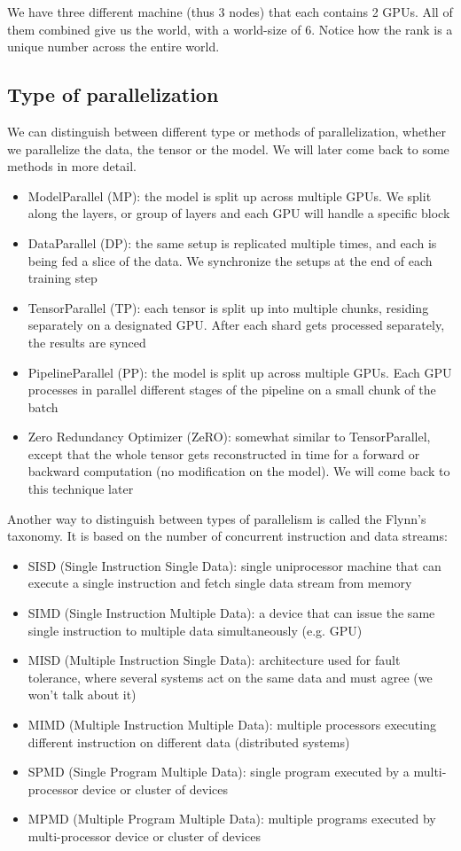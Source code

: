 \documentclass{article}
\begin{document}
We have three different machine (thus 3 nodes) that each contains 2 GPUs. All of them combined give us the world, with a world-size of 6. Notice how the rank is a unique number across the entire world.

\subsection{Type of parallelization}
We can distinguish between different type or methods of parallelization, whether we parallelize the data, the tensor or the model. We will later come back to some methods in more detail.
\begin{itemize}
  \item ModelParallel (MP): the model is split up across multiple GPUs. We split along the layers, or group of layers and each GPU will handle a specific block
  \item DataParallel (DP): the same setup is replicated multiple times, and each is being fed a slice of the data. We synchronize the setups at the end of each training step
  \item TensorParallel (TP): each tensor is split up into multiple chunks, residing separately on a designated GPU. After each shard gets processed separately, the results are synced
  \item PipelineParallel (PP): the model is split up across multiple GPUs. Each GPU processes in parallel different stages of the pipeline on a small chunk of the batch
  \item Zero Redundancy Optimizer (ZeRO): somewhat similar to TensorParallel, except that the whole tensor gets reconstructed in time for a forward or backward computation (no modification on the model). We will come back to this technique later
\end{itemize}

Another way to distinguish between types of parallelism is called the Flynn's taxonomy. It is based on the number of concurrent instruction and data streams:
\begin{itemize}
  \item SISD (Single Instruction Single Data): single uniprocessor machine that can execute a single instruction and fetch single data stream from memory
  \item SIMD (Single Instruction Multiple Data): a device that can issue the same single instruction to multiple data simultaneously (e.g. GPU)
  \item MISD (Multiple Instruction Single Data): architecture used for fault tolerance, where several systems act on the same data and must agree (we won't talk about it)
  \item MIMD (Multiple Instruction Multiple Data): multiple processors executing different instruction on different data (distributed systems)
  \item SPMD (Single Program Multiple Data): single program executed by a multi-processor device or cluster of devices
  \item MPMD (Multiple Program Multiple Data): multiple programs executed by multi-processor device or cluster of devices
\end{itemize}
\end{document}
